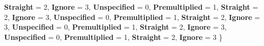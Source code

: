 \begin{DoxyCompactItemize}
{\bfseries Straight} = 2, 
{\bfseries Ignore} = 3, 
\newline
{\bfseries Unspecified} = 0, 
{\bfseries Premultiplied} = 1, 
{\bfseries Straight} = 2, 
{\bfseries Ignore} = 3, 
\newline
{\bfseries Unspecified} = 0, 
{\bfseries Premultiplied} = 1, 
{\bfseries Straight} = 2, 
{\bfseries Ignore} = 3, 
\newline
{\bfseries Unspecified} = 0, 
{\bfseries Premultiplied} = 1, 
{\bfseries Straight} = 2, 
{\bfseries Ignore} = 3, 
\newline
{\bfseries Unspecified} = 0, 
{\bfseries Premultiplied} = 1, 
{\bfseries Straight} = 2, 
{\bfseries Ignore} = 3
 \}
\end{DoxyCompactItemize}
